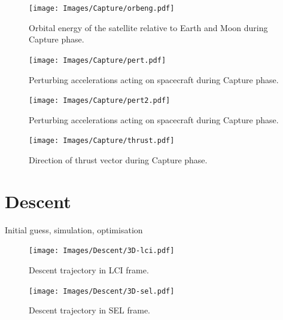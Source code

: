 \begin{figure}
\begin{center}
\texttt{[image: Images/Capture/orbeng.pdf]}
\end{center}
\caption{Orbital energy of the satellite relative to Earth and Moon during Capture phase.}
\label{fig:Capture-orbeng}
\end{figure}

\begin{figure}
\begin{center}
\texttt{[image: Images/Capture/pert.pdf]}
\end{center}
\caption{Perturbing accelerations acting on spacecraft during Capture phase.}
\label{fig:Capture-pert}
\end{figure}

\begin{figure}
\begin{center}
\texttt{[image: Images/Capture/pert2.pdf]}
\end{center}
\caption{Perturbing accelerations acting on spacecraft during Capture phase.}
\label{fig:Capture-pert2}
\end{figure}

\begin{figure}
\begin{center}
\texttt{[image: Images/Capture/thrust.pdf]}
\end{center}
\caption{Direction of thrust vector during Capture phase.}
\label{fig:Capture-thrust}
\end{figure}


\clearpage

\section{Descent}
Initial guess, simulation, optimisation

\begin{figure}
\begin{center}
\texttt{[image: Images/Descent/3D-lci.pdf]}
\end{center}
\caption{Descent trajectory in LCI frame.}
\label{fig:Descent-3D-lci}
\end{figure}

\begin{figure}
\begin{center}
\texttt{[image: Images/Descent/3D-sel.pdf]}
\end{center}
\caption{Descent trajectory in SEL frame.}
\label{fig:Descent-3D-sel}
\end{figure}

